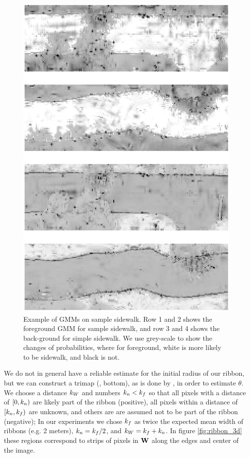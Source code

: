 \begin{figure}[H]
    \centering
    \includegraphics[width=0.6\columnwidth]{Figures/GMM_sample6.png}
    \caption[\ac{GMM} Result 2]{Example of GMMs on sample sidewalk. Row 1 and 2 shows the foreground GMM for sample sidewalk, and row 3 and 4 shows the back-ground for simple sidewalk. We use grey-scale to show the changes of probabilities, where for foreground, white is more likely to be sidewalk, and black is not.}
    \label{fig:GMM_result_2}
\end{figure}

We do not in general have a reliable estimate for the initial radius of our ribbon, but we can construct a trimap (, bottom), as is done by \GrabCut{}, in order to estimate $\theta$. 
We choose a distance $k_W$ and numbers $k_n < k_f$ so that all pixels with a distance of $[0, k_n)$ are likely part of the ribbon (positive), all pixels within a distance of $[k_n, k_f)$ are unknown, and others are are assumed not to be part of the ribbon (negative);
In our experiments we chose  $k_f$ as twice the expected mean width of ribbons (e.g. 2 meters), $k_n = k_f/2$, and $k_W=k_f+k_n$.  
In figure \ref{fig:ribbon_3d} these regions correspond to strips of pixels in $\mathbf{W}{}$ along the edges and center of the image.


